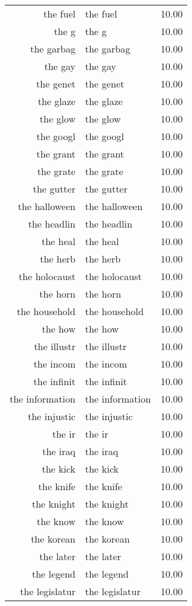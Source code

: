 \begin{table}[ht]
\begin{tabular}{rlr}
  the fuel & the fuel & 10.00 \\ 
  the g & the g & 10.00 \\ 
  the garbag & the garbag & 10.00 \\ 
  the gay & the gay & 10.00 \\ 
  the genet & the genet & 10.00 \\ 
  the glaze & the glaze & 10.00 \\ 
  the glow & the glow & 10.00 \\ 
  the googl & the googl & 10.00 \\ 
  the grant & the grant & 10.00 \\ 
  the grate & the grate & 10.00 \\ 
  the gutter & the gutter & 10.00 \\ 
  the halloween & the halloween & 10.00 \\ 
  the headlin & the headlin & 10.00 \\ 
  the heal & the heal & 10.00 \\ 
  the herb & the herb & 10.00 \\ 
  the holocaust & the holocaust & 10.00 \\ 
  the horn & the horn & 10.00 \\ 
  the household & the household & 10.00 \\ 
  the how & the how & 10.00 \\ 
  the illustr & the illustr & 10.00 \\ 
  the incom & the incom & 10.00 \\ 
  the infinit & the infinit & 10.00 \\ 
  the information & the information & 10.00 \\ 
  the injustic & the injustic & 10.00 \\ 
  the ir & the ir & 10.00 \\ 
  the iraq & the iraq & 10.00 \\ 
  the kick & the kick & 10.00 \\ 
  the knife & the knife & 10.00 \\ 
  the knight & the knight & 10.00 \\ 
  the know & the know & 10.00 \\ 
  the korean & the korean & 10.00 \\ 
  the later & the later & 10.00 \\ 
  the legend & the legend & 10.00 \\ 
  the legislatur & the legislatur & 10.00 \\ 

\end{tabular}
\end{table}
